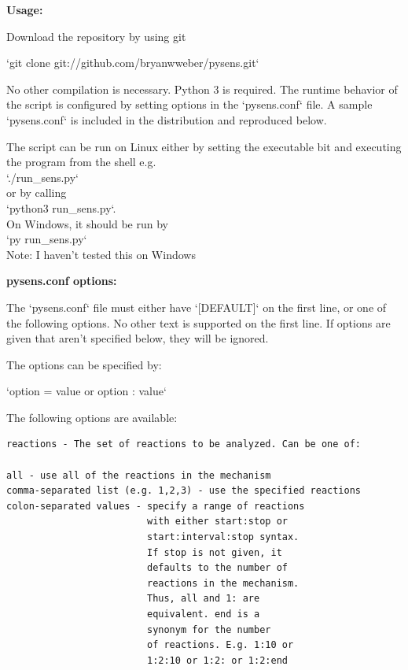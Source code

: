 \documentclass[12pt,letterpaper,oneside,draft]{book}
\begin{document}
\begin{appendices}
\begin{singlespace}
{\blankline

{\large \textbf{Usage:}}

Download the repository by using git

`git clone git://github.com/bryanwweber/pysens.git`

No other compilation is necessary. Python 3 is required.
The runtime behavior of the script is configured by setting options in
the `pysens.conf` file. A sample `pysens.conf` is included in the
distribution and reproduced below.

The script can be run on Linux either by setting the executable bit
and executing the program from the shell e.g.\\
`./run_sens.py`\\
or by calling\\
`python3 run_sens.py`.\\
On Windows, it should be run by\\
`py run_sens.py`\\
Note: I haven't tested this on Windows

\blankline

{\large \textbf{pysens.conf options:}}

The `pysens.conf` file must either have `[DEFAULT]` on the first line,
or one of the following options. No other text is supported on the first
line. If options are given that aren't specified below, they will be
ignored.

The options can be specified by:

`option = value or option : value`

The following options are available:

\begin{Verbatim}
reactions - The set of reactions to be analyzed. Can be one of:

all - use all of the reactions in the mechanism
comma-separated list (e.g. 1,2,3) - use the specified reactions
colon-separated values - specify a range of reactions
                         with either start:stop or
                         start:interval:stop syntax.
                         If stop is not given, it
                         defaults to the number of
                         reactions in the mechanism.
                         Thus, all and 1: are
                         equivalent. end is a
                         synonym for the number
                         of reactions. E.g. 1:10 or
                         1:2:10 or 1:2: or 1:2:end


\end{Verbatim}}
\end{singlespace}
\end{appendices}
\end{document}
